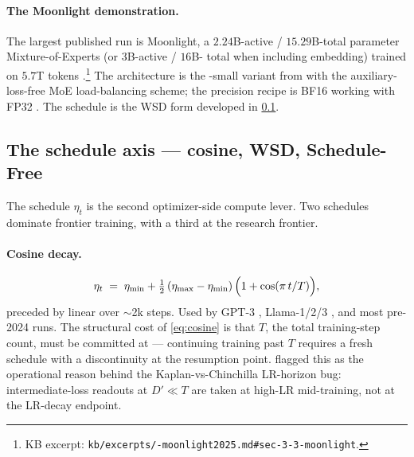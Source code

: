 \paragraph{The Moonlight demonstration.}
The largest published  run is Moonlight, a $2.24$B-active /
$15.29$B-total parameter Mixture-of-Experts (or $3$B-active / $16$B-
total when including embedding) trained on $5.7$T tokens
\citep[\S 3.3]{muon-moonlight2025}.\footnote{KB excerpt:
\texttt{kb/excerpts/-moonlight2025.md\#sec-3-3-moonlight}.} The
architecture is the -small variant from \citet{deepseek-v3}
with the auxiliary-loss-free MoE load-balancing scheme; the precision
recipe is BF16 working with FP32 . The schedule is the
WSD form developed in \cref{sec:opt-schedules}.

\subsection{The schedule axis --- cosine, WSD, Schedule-Free}
\label{sec:opt-schedules}

The schedule $\eta_t$ is the second optimizer-side compute lever.
Two schedules dominate frontier  training, with a third at the
research frontier.

\paragraph{Cosine decay.}
\citep[Loshchilov \&
Hutter 2017]{muon-moonlight2025}
\begin{equation}
\eta_t \;=\; \eta_{\min} + \tfrac{1}{2}\,(\eta_{\max} - \eta_{\min})\,\Bigl(1 + \cos(\pi\, t / T)\Bigr),
\label{eq:cosine}
\end{equation}
preceded by linear  over $\sim$2k steps. Used by GPT-3
\citep{brown2020}, Llama-1/2/3 \citep{meta-llama3}, and most pre-2024
runs. The structural cost of \cref{eq:cosine} is that $T$, the total
training-step count, must be committed at  --- continuing
training past $T$ requires a fresh schedule with a discontinuity at
the resumption point.  flagged this as the
operational reason behind the Kaplan-vs-Chinchilla LR-horizon bug:
intermediate-loss readouts at $D' \ll T$ are taken at high-LR
mid-training, not at the LR-decay endpoint.


